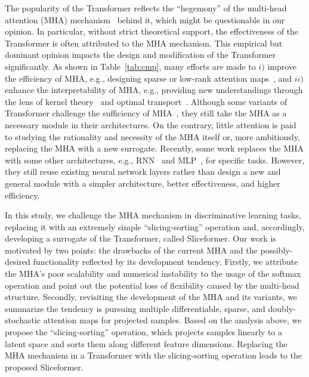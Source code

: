The popularity of the Transformer reflects the ``hegemony'' of the multi-head attention (MHA) mechanism~\cite{vaswani2017attention} behind it, which might be questionable in our opinion.
In particular, without strict theoretical support, the effectiveness of the Transformer is often attributed to the MHA mechanism.
This empirical but dominant opinion impacts the design and modification of the Transformer significantly.
As shown in Table~\ref{tab:cmp}, many efforts are made to $i)$ improve the efficiency of MHA, e.g., designing sparse or low-rank attention maps~\cite{child2019generating,kitaev2020reformer,wang2020linformer}, and $ii)$ enhance the interpretability of MHA, e.g., providing new understandings through the lens of kernel theory~\cite{tsai2019transformer,zhen2022cosformer} and optimal transport~\cite{tay2020sparse,sander2022sinkformers}.
Although some variants of Transformer challenge the sufficiency of MHA~\cite{dong2021attention,gu2021efficiently,ma2022mega}, they still take the MHA as a necessary module in their architectures. 
On the contrary, little attention is paid to studying the rationality and necessity of the MHA itself or, more ambitiously, replacing the MHA with a new surrogate. 
Recently, some work replaces the MHA with some other architectures, e.g., RNN~\cite{katharopoulos2020transformers} and MLP~\cite{tolstikhin2021mlp}, for specific tasks. 
However, they still reuse existing neural network layers rather than design a new and general module with a simpler architecture, better effectiveness, and higher efficiency.


In this study, we challenge the MHA mechanism in discriminative learning tasks, replacing it with an extremely simple ``slicing-sorting'' operation and, accordingly, developing a surrogate of the Transformer, called Sliceformer. 
Our work is motivated by two points: the drawbacks of the current MHA and the possibly-desired functionality reflected by its development tendency. 
Firstly, we attribute the MHA's poor scalability and numerical instability to the usage of the softmax operation and point out the potential loss of flexibility caused by the multi-head structure. 
Secondly, revisiting the development of the MHA and its variants, we summarize the tendency is pursuing multiple differentiable, sparse, and doubly-stochastic attention maps for projected samples. 
Based on the analysis above, we propose the ``slicing-sorting'' operation, which projects samples linearly to a latent space and sorts them along different feature dimensions. 
Replacing the MHA mechanism in a Transformer with the slicing-sorting operation leads to the proposed Sliceformer.


